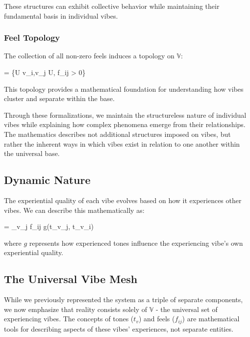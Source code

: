 \documentclass{article}
\let\oldequation\equation
\let\endoldequation\endequation
\renewenvironment{equation}{%
    \noindent\vspace{-\parskip}\vspace{-\baselineskip}%
    \oldequation
}{%
    \endoldequation
    \noindent\vspace{-\parskip}\vspace{-\baselineskip}%
}
\theoremstyle{definition}
\theoremstyle{axiom}
\theoremstyle{theorem}
\theoremstyle{lemma}
\theoremstyle{proposition}
\begin{document}
These structures can exhibit collective behavior while maintaining their fundamental basis in individual vibes.

\subsubsection{Feel Topology}

The collection of all non-zero feels induces a topology on $\mathbb{V}$:

\begin{equation}
\tau = \{U \subset {} \mid \forall v_i,v_j \in U, f_{ij} > 0\}
\end{equation}

This topology provides a mathematical foundation for understanding how vibes cluster and separate within the base.

Through these formalizations, we maintain the structureless nature of individual vibes while explaining how complex phenomena emerge from their relationships. The mathematics describes not additional structures imposed on vibes, but rather the inherent ways in which vibes exist in relation to one another within the universal base.

\subsection{Dynamic Nature}

The experiential quality of each vibe evolves based on how it experiences other vibes. We can describe this mathematically as:

\begin{equation}
 = \sum_{v_j \in {}} f_{ij} \cdot g({t}_{v_j}, {t}_{v_i})
\end{equation}

where $g$ represents how experienced tones influence the experiencing vibe's own experiential quality.

\subsection{The Universal Vibe Mesh}

While we previously represented the system as a triple of separate components, we now emphasize that reality consists solely of $\mathbb{V}$ - the universal set of experiencing vibes. The concepts of tones (${t}_v$) and feels ($f_{ij}$) are mathematical tools for describing aspects of these vibes' experiences, not separate entities.
\end{document}
